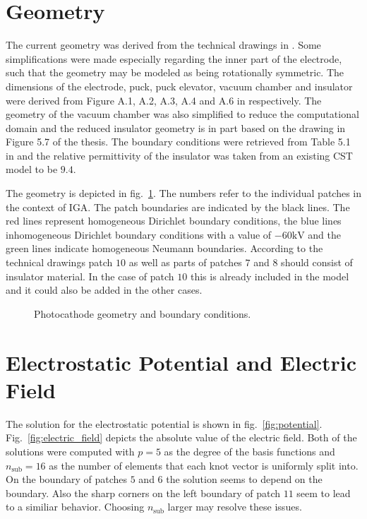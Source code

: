 \section{Geometry}
The current geometry was derived from the technical drawings in \cite{thesis}. Some simplifications were made especially regarding the inner part of the electrode, such that the geometry may be modeled as being rotationally symmetric. The dimensions of the electrode, puck, puck elevator, vacuum chamber and insulator were derived from Figure A.1, A.2, A.3, A.4 and A.6 in \cite{thesis} respectively. The geometry of the vacuum chamber was also simplified to reduce the computational domain and the reduced insulator geometry is in part based on the drawing in Figure 5.7 of the thesis.
The boundary conditions were retrieved from Table 5.1 in \cite{thesis} and the relative permittivity of the insulator was taken from an existing CST model to be $9.4$.

The geometry is depicted in fig.~\ref{fig:geometry}. The numbers refer to the individual patches in the context of IGA. The patch boundaries are indicated by the black lines. The red lines represent homogeneous Dirichlet boundary conditions, the blue lines inhomogeneous Dirichlet boundary conditions with a value of $-60 \mathrm{kV}$ and the green lines indicate homogeneous Neumann boundaries.
According to the technical drawings patch $10$ as well as parts of patches $7$ and $8$ should consist of insulator material. In the case of patch $10$ this is already included in the model and it could also be added in the other cases.

\begin{center}
\begin{figure}[H]
  
  \caption{Photocathode geometry and boundary conditions.}
  \label{fig:geometry}
\end{figure}
\end{center}

\section{Electrostatic Potential and Electric Field}
\label{sec:potential_field}
The solution for the electrostatic potential is shown in fig.~\ref{fig:potential}. Fig.~\ref{fig:electric_field} depicts the absolute value of the electric field.
Both of the solutions were computed with $p=5$ as the degree of the basis functions and $n_\mathrm{sub}=16$ as the number of elements that each knot vector is uniformly split into.
On the boundary of patches $5$ and $6$ the solution seems to depend on the boundary. Also the sharp corners on the left boundary of patch $11$ seem to lead to a similiar behavior. Choosing $n_\mathrm{sub}$ larger may resolve these issues.

